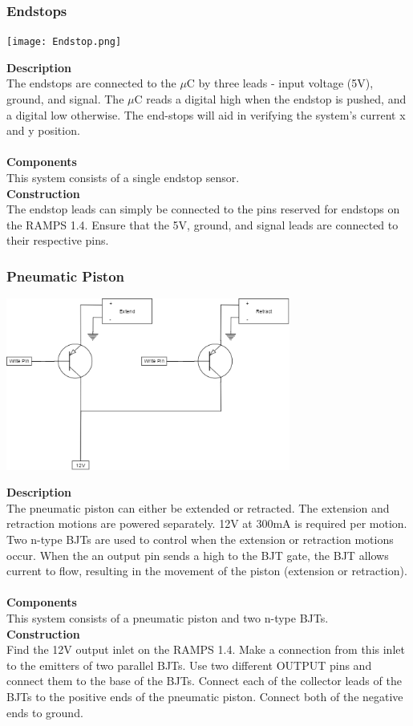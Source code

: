 \documentclass[titlepage]{article}
\begin{document}
\subsubsection{Endstops}
\begin{center}
	\texttt{[image: Endstop.png]}
\label{fig:elecContextDiagramFig}
\end{center}
\textbf{Description}\\
The endstops are connected to the $\mu$C by three leads - input voltage (5V), ground, and signal. The $\mu$C reads a digital high when the endstop is pushed, and a digital low otherwise. The end-stops will aid in verifying the system's current x and y position.\\\\
\textbf{Components}\\
This system consists of a single endstop sensor.\\
\textbf{Construction}\\
The endstop leads can simply be connected to the pins reserved for endstops on the RAMPS 1.4. Ensure that the 5V, ground, and signal leads are connected to their respective pins.

\newpage
\subsubsection{Pneumatic Piston}
\begin{center}
	\includegraphics[width = 0.7\textwidth]{PneumaticPiston.png}
\label{fig:PneumaticPistonFig}
\end{center}
\textbf{Description}\\
The pneumatic piston can either be extended or retracted. The extension and retraction motions are powered separately. 12V at 300mA is required per motion. Two n-type BJTs are used to control when the extension or retraction motions occur. When the an output pin sends a high to the BJT gate, the BJT allows current to flow, resulting in the movement of the piston (extension or retraction).\\\\
\textbf{Components}\\
This system consists of a pneumatic piston and two n-type BJTs.\\
\textbf{Construction}\\
Find the 12V output inlet on the RAMPS 1.4. Make a connection from this inlet to the emitters of two parallel BJTs. Use two different OUTPUT pins and connect them to the base of the BJTs. Connect each of the collector leads of the BJTs to the positive ends of the pneumatic piston. Connect both of the negative ends to ground.
\end{document}

